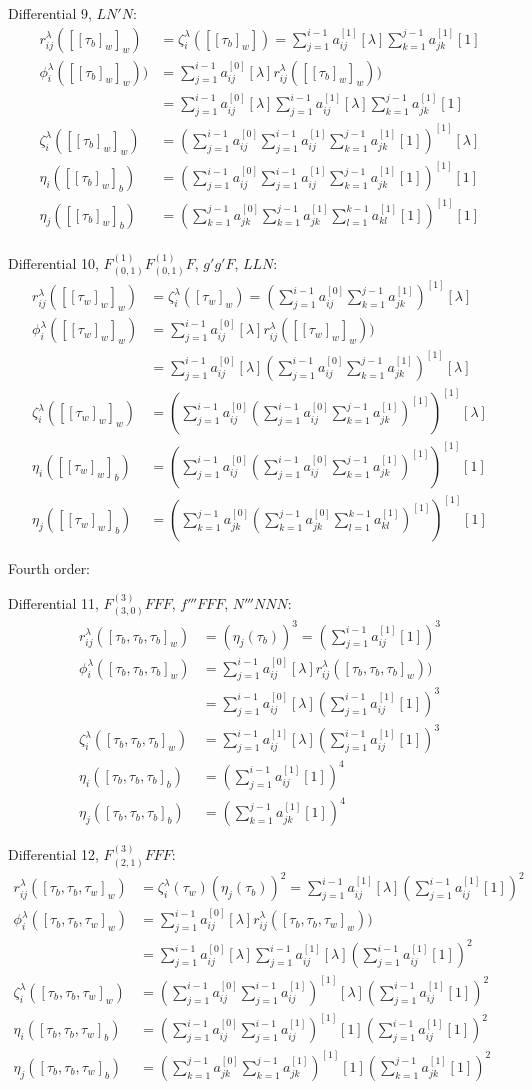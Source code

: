 \documentclass[english,unicode]{article}
\def\SiL{\sum_{j=1}^{i-1}a_{ij}^{[0]}[\lambda]}
\def\SiIL{\sum_{j=1}^{i-1}a_{ij}^{[1]}[\lambda]}
\def\Si{\sum_{j=1}^{i-1}a_{ij}^{[0]}}
\def\Sj{\sum_{k=1}^{j-1}a_{jk}^{[0]}}
\def\SiI{\sum_{j=1}^{i-1}a_{ij}^{[1]}}
\def\SjI{\sum_{k=1}^{j-1}a_{jk}^{[1]}}
\def\SkI{\sum_{l=1}^{k-1}a_{kl}^{[1]}}
\def\SiIO{\sum_{j=1}^{i-1}a_{ij}^{[1]}[1]}
\def\SjIO{\sum_{k=1}^{j-1}a_{jk}^{[1]}[1]}
\def\SkIO{\sum_{l=1}^{k-1}a_{kl}^{[1]}[1]}
\def\EIL{^{[1]}[\lambda]}
\def\EI{^{[1]}}
\def\EIO{^{[1]}[1]}
\begin{document}
Differential 9, $LN'N$:
\begin{align*}
r_{ij}^\lambda([[\tau_b]_w]_w)& =\zeta_i^\lambda([[\tau_b]_w])=\SiIL \SjIO\\
\phi_i^\lambda([[\tau_b]_w]_w)) &= \SiL r_{ij}^\lambda ([[\tau_b]_w]_w))\\
&=\SiL \SiIL \SjIO\\
\zeta_i^\lambda([[\tau_b]_w]_w)& =(\Si \SiI \SjIO)\EIL\\
\eta_i([[\tau_b]_w]_b)& = (\Si \SiI \SjIO)\EIO\\
\eta_j([[\tau_b]_w]_b)& =(\Sj \SjI\SkIO)\EIO\\
\end{align*}

Differential 10, $F^{(1)}_{(0,1)}F^{(1)}_{(0,1)}F$, $g'g'F$, $LLN$:
\begin{align*}
r_{ij}^\lambda([[\tau_w]_w]_w)& =\zeta_i^\lambda([\tau_w]_w)=(\Si \SjI )\EIL\\
\phi_i^\lambda([[\tau_w]_w]_w) &= \SiL r_{ij}^\lambda ([[\tau_w]_w]_w))\\
&= \SiL (\Si \SjI )\EIL\\
\zeta_i^\lambda([[\tau_w]_w]_w)& =(\Si (\Si \SjI )\EI)\EIL \\
\eta_i([[\tau_w]_w]_b)& = (\Si (\Si \SjI )\EI)\EIO\\
\eta_j([[\tau_w]_w]_b)& = (\Sj (\Sj \SkI )\EI)\EIO
\end{align*}

Fourth order:

Differential 11, $F^{(3)}_{(3,0)}FFF$, $f'''FFF$, $N'''NNN$:
\begin{align*}
r_{ij}^\lambda([\tau_b,\tau_b,\tau_b]_w)& =(\eta_j(\tau_b))^3=(\SiIO)^3\\
\phi_i^\lambda([\tau_b,\tau_b,\tau_b]_w) &= \SiL r_{ij}^\lambda ([\tau_b,\tau_b,\tau_b]_w))\\
&= \SiL (\SiIO)^3\\
\zeta_i^\lambda([\tau_b,\tau_b,\tau_b]_w)& = \SiIL (\SiIO)^3 \\
\eta_i([\tau_b,\tau_b,\tau_b]_b)& = (\SiIO)^4\\
\eta_j([\tau_b,\tau_b,\tau_b]_b)& = (\SjIO)^4
\end{align*}

Differential 12, $F^{(3)}_{(2,1)}FFF$:
\begin{align*}
r_{ij}^\lambda([\tau_b,\tau_b,\tau_w]_w)& =\zeta_i^\lambda(\tau_w)(\eta_j(\tau_b))^2=\SiIL(\SiIO)^2\\
\phi_i^\lambda([\tau_b,\tau_b,\tau_w]_w) &= \SiL r_{ij}^\lambda ([\tau_b,\tau_b,\tau_w]_w))\\
&= \SiL\SiIL(\SiIO)^2\\
\zeta_i^\lambda([\tau_b,\tau_b,\tau_w]_w)& = (\Si\SiI)\EIL(\SiIO)^2 \\
\eta_i([\tau_b,\tau_b,\tau_w]_b)& = (\Si\SiI)\EIO(\SiIO)^2\\
\eta_j([\tau_b,\tau_b,\tau_w]_b)& = (\Sj\SjI)\EIO(\SjIO)^2
\end{align*}
\end{document}
